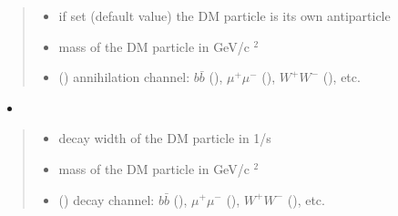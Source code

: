 \documentclass[letterpaper,10pt,english]{sphinxmanual}
\begin{document}
\begin{fulllineitems}
\begin{quote}
\begin{description}
\begin{itemize}
\item {} 
\sphinxAtStartPar
{} \textendash{} if set  (default value) the DM particle is its own antiparticle

\item {} 
\sphinxAtStartPar
{} \textendash{} mass of the DM particle in GeV/c \({}^2\)

\item {} 
\sphinxAtStartPar
{} () \textendash{} annihilation channel: \(b\bar b\) (), \(\mu^+ \mu^-\) (), \(W^+ W^-\) (), etc.

\end{itemize}

\end{description}\end{quote}
\begin{itemize}
\item {} 
\sphinxAtStartPar
{}

\end{itemize}
\begin{quote}\begin{description}
\begin{itemize}
\item {} 
\sphinxAtStartPar
{} \textendash{} decay width of the DM particle in 1/s

\item {} 
\sphinxAtStartPar
{} \textendash{} mass of the DM particle in GeV/c \({}^2\)

\item {} 
\sphinxAtStartPar
{} () \textendash{} decay channel: \(b\bar b\) (), \(\mu^+ \mu^-\) (), \(W^+ W^-\) (), etc.


\end{itemize}
\end{description}
\end{quote}
\end{fulllineitems}
\end{document}
